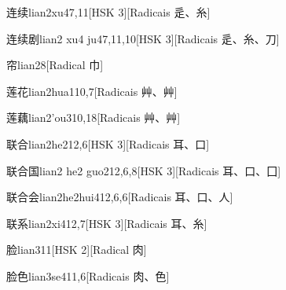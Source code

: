 \begin{entry}{连续}{lian2xu4}{7,11}[HSK 3][Radicais ⾡、⽷]
\end{entry}

\begin{entry}{连续剧}{lian2 xu4 ju4}{7,11,10}[HSK 3][Radicais ⾡、⽷、⼑]
\end{entry}

\begin{entry}{帘}{lian2}{8}[Radical ⼱]
\end{entry}

\begin{entry}{莲花}{lian2hua1}{10,7}[Radicais ⾋、⾋]
\end{entry}

\begin{entry}{莲藕}{lian2'ou3}{10,18}[Radicais ⾋、⾋]
\end{entry}

\begin{entry}{联合}{lian2he2}{12,6}[HSK 3][Radicais ⽿、⼝]
\end{entry}

\begin{entry}{联合国}{lian2 he2 guo2}{12,6,8}[HSK 3][Radicais ⽿、⼝、⼞]
\end{entry}

\begin{entry}{联合会}{lian2he2hui4}{12,6,6}[Radicais ⽿、⼝、⼈]
\end{entry}

\begin{entry}{联系}{lian2xi4}{12,7}[HSK 3][Radicais ⽿、⽷]
\end{entry}

\begin{entry}{脸}{lian3}{11}[HSK 2][Radical ⾁]
\end{entry}

\begin{entry}{脸色}{lian3se4}{11,6}[Radicais ⾁、⾊]
\end{entry}

